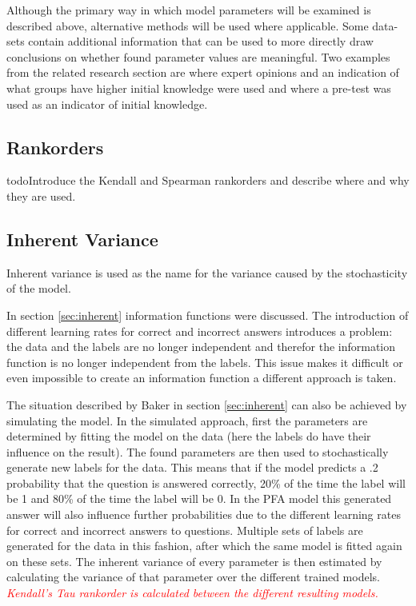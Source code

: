 \documentclass{scrartcl}
\newcommand\todo[1]{\textit{\textcolor{red}{#1}}}
\begin{document}
Although the primary way in which model parameters will be examined is described above, alternative methods will be used where applicable. Some data-sets contain additional information that can be used to more directly draw conclusions on whether found parameter values are meaningful. Two examples from the related research section are \cite{eirt} where expert opinions and an indication of what groups have higher initial knowledge were used and \cite{ktpfa} where a pre-test was used as an indicator of initial knowledge.

\subsection{Rankorders}
todo{Introduce the Kendall and Spearman rankorders and describe where and why they are used.}

\subsection{Inherent Variance}
Inherent variance is used as the name for the variance caused by the stochasticity of the model. 

In section \ref{sec:inherent} information functions were discussed. The introduction of different learning rates for correct and incorrect answers introduces a problem: the data and the labels are no longer independent and therefor the information function is no longer independent from the labels. This issue makes it difficult or even impossible to create an information function a different approach is taken.

The situation described by Baker in section \ref{sec:inherent} can also be achieved by simulating the model. In the simulated approach, first the parameters are determined by fitting the model on the data (here the labels do have their influence on the result). The found parameters are then used to stochastically generate new labels for the data. This means that if the model predicts a .2 probability that the question is answered correctly, 20\% of the time the label will be 1 and 80\% of the time the label will be 0. In the PFA model this generated answer will also influence further probabilities due to the different learning rates for correct and incorrect answers to questions. Multiple sets of labels are generated for the data in this fashion, after which the same model is fitted again on these sets. The inherent variance of every parameter is then estimated by calculating the variance of that parameter over the different trained models. \todo{ Kendall's Tau rankorder is calculated between the different resulting models.}
\end{document}
